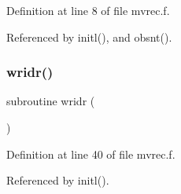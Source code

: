 Definition at line 8 of file mvrec.\+f.



Referenced by initl(), and obsnt().

\mbox{\label{mvrec_8f_a1612710cecd3e00690ea04a54fc79763}} 
\subsubsection{\texorpdfstring{wridr()}{wridr()}}
{\footnotesize\ttfamily subroutine wridr (\begin{DoxyParamCaption}{ }\end{DoxyParamCaption})}



Definition at line 40 of file mvrec.\+f.



Referenced by initl().

